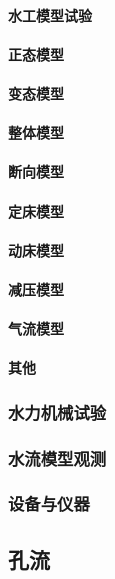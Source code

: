 \documentclass[UTF8]{../../ApplicationUniverse}
\begin{document}
            \paragraph{水工模型试验}
            \paragraph{正态模型}
            \paragraph{变态模型}
            \paragraph{整体模型}
            \paragraph{断向模型}
            \paragraph{定床模型}
            \paragraph{动床模型}
            \paragraph{减压模型}
            \paragraph{气流模型}
            \paragraph{其他}
        \subsubsection{水力机械试验}
        \subsubsection{水流模型观测}
        \subsubsection{设备与仪器}
    \subsection{孔流}
\end{document}
